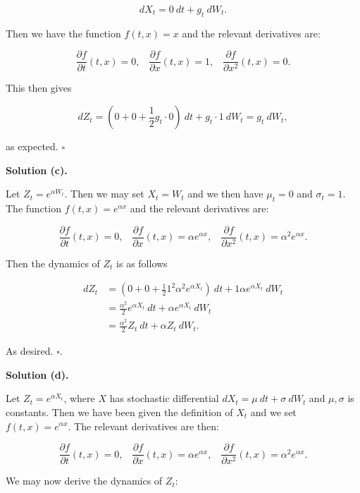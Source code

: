 \documentclass[
]{book}
\begin{document}
\[
dX_t=0\ dt+g_t\ dW_t.
\]

Then we have the function \(f(t,x)=x\) and the relevant derivatives are:

\[
\frac{\partial f}{\partial t}(t,x)=0,\hspace{10pt}\frac{\partial f}{\partial x}(t,x) =1,\hspace{10pt}\frac{\partial f}{\partial x^2}(t,x) =0.
\]

This then gives

\[
dZ_t=\left(0+0+\frac{1}{2}g_t\cdot 0\right)\ dt + g_t\cdot 1\ dW_t=g_t\ dW_t,
\]

as expected. \(\square\)

\textbf{Solution (c).}

Let \(Z_t=e^{\alpha W_t}\). Then we may set \(X_t=W_t\) and we then have \(\mu_t=0\) and \(\sigma_t=1\). The function \(f(t,x)=e^{\alpha x}\) and the relevant derivatives are:

\[
\frac{\partial f}{\partial t}(t,x)=0,\hspace{10pt}\frac{\partial f}{\partial x}(t,x) =\alpha e^{\alpha x},\hspace{10pt}\frac{\partial f}{\partial x^2}(t,x) =\alpha^2 e^{\alpha x}.
\]

Then the dynamics of \(Z_t\) is as follows

\begin{align*}
dZ_t&=\left(0+0+\frac{1}{2}1^2\alpha^2e^{\alpha X_t}\right)\ dt + 1\alpha e^{\alpha X_t}\ dW_t\\
&=\frac{\alpha^2}{2}e^{\alpha X_t}\ dt +\alpha e^{\alpha X_t}\ dW_t\\
&=\frac{\alpha^2}{2}Z_t\ dt +\alpha Z_t\ dW_t.
\end{align*}

As desired. \(\square\).

\textbf{Solution (d).}

Let \(Z_t=e^{\alpha X_t}\), where \(X\) has stochastic differential \(dX_t=\mu\ dt + \sigma\ dW_t\) and \(\mu,\sigma\) is constants. Then we have been given the definition of \(X_t\) and we set \(f(t,x)=e^{\alpha x}\). The relevant derivatives are then:

\[
\frac{\partial f}{\partial t}(t,x)=0,\hspace{10pt}\frac{\partial f}{\partial x}(t,x) =\alpha e^{\alpha x},\hspace{10pt}\frac{\partial f}{\partial x^2}(t,x) =\alpha^2 e^{\alpha x}.
\]

We may now derive the dynamics of \(Z_t\):
\end{document}
